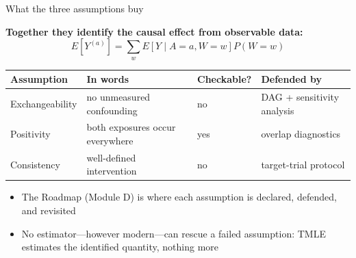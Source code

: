 \documentclass[aspectratio=169,10pt]{beamer}
\begin{document}
\begin{frame}[t]{What the three assumptions buy}
  \vspace*{0.35cm}

  \textbf{Together they identify the causal effect from observable data:}
  \[
    E\!\left[Y^{(a)}\right]
    = \sum_{w} E\!\left[Y \mid A = a, W = w\right] P(W = w)
  \]

  \vspace{0.5em}
  \begin{center}
    \small
    \begin{tabular}{@{}llll@{}}
      \toprule
      \textbf{Assumption} & \textbf{In words} & \textbf{Checkable?} &
        \textbf{Defended by} \\
      \midrule
      Exchangeability & no unmeasured confounding & no &
        DAG + sensitivity analysis \\
      Positivity & both exposures occur everywhere & yes &
        overlap diagnostics \\
      Consistency & well-defined intervention & no &
        target-trial protocol \\
      \bottomrule
    \end{tabular}
  \end{center}

  \vspace{0.7em}
  \begin{itemize}
    \item The Roadmap (Module D) is where each assumption is declared,
      defended, and revisited
    \item No estimator---however modern---can rescue a failed
      assumption: TMLE estimates the identified quantity, nothing more
  \end{itemize}
\end{frame}
\end{document}
